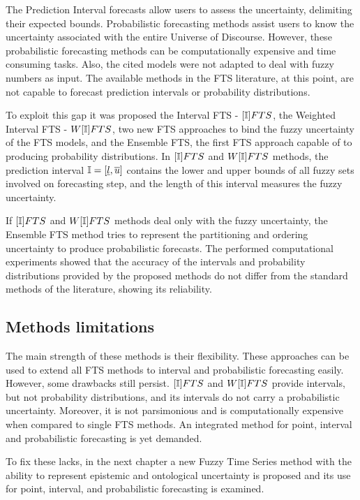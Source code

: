 The Prediction Interval forecasts allow users to assess the uncertainty, delimiting their expected bounds. Probabilistic forecasting methods assist users to know the uncertainty associated with the entire Universe of Discourse. However, these probabilistic forecasting methods can be computationally expensive and time consuming tasks. Also, the cited models were not adapted to deal with fuzzy numbers as input. The available methods in the FTS literature, at this point, are not capable to forecast prediction intervals or probability distributions.

To exploit this gap it was proposed the Interval FTS - $[\mathbb{I}]FTS$, the Weighted Interval FTS - $W[\mathbb{I}]FTS$, two new FTS approaches to bind the fuzzy uncertainty of the FTS models, and the Ensemble FTS, the first FTS approach capable of to producing probability distributions. In $[\mathbb{I}]FTS$ and $W[\mathbb{I}]FTS$ methods, the prediction interval $\mathbb{I} = [\underline{l},\overline{u}{]}$ contains the lower and upper bounds of all fuzzy sets involved on forecasting step, and the length of this interval measures the fuzzy uncertainty.

If $[\mathbb{I}]FTS$ and $W[\mathbb{I}]FTS$ methods deal only with the fuzzy uncertainty, the Ensemble FTS method tries to represent the partitioning and ordering uncertainty to produce probabilistic forecasts. The performed computational experiments showed that the accuracy of the intervals and probability distributions provided by the proposed methods do not differ from the standard methods of the literature, showing its reliability.

\subsection{Methods limitations}

The main strength of these methods is their flexibility. These approaches can be used to extend all FTS methods to interval and probabilistic forecasting easily. However, some drawbacks still persist.  $[\mathbb{I}]FTS$ and $W[\mathbb{I}]FTS$ provide intervals, but not probability distributions, and its intervals do not carry a probabilistic uncertainty. Moreover, it is not parsimonious and is computationally expensive when compared to single FTS methods. An integrated method for point, interval and probabilistic forecasting is yet demanded. 

To fix these lacks, in the next chapter a new Fuzzy Time Series method with the ability to  represent epistemic and ontological uncertainty is proposed and its use for point, interval, and probabilistic forecasting is examined.

